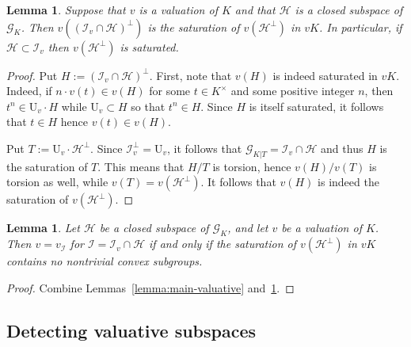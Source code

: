 \documentclass[12pt]{amsart}
\newcommand{\Urm}{\mathrm{U}}
\newcommand{\Gcal}{\mathcal{G}}
\newcommand{\Ical}{\mathcal{I}}
\newcommand{\Hcal}{\mathcal{H}}
\newtheorem{lemma}[theorem]{Lemma}
\theoremstyle{definition}
\begin{document}
\begin{lemma}\label{lemma:v_perp_saturation}
  Suppose that $v$ is a valuation of $K$ and that $\Hcal$ is a closed subspace of $\Gcal_{K}$.
  Then $v((\Ical_{v} \cap \Hcal)^{\perp})$ is the saturation of $v(\Hcal^{\perp})$ in $vK$.
  In particular, if $\Hcal \subset \Ical_{v}$ then $v(\Hcal^{\perp})$ is saturated.
\end{lemma}
\begin{proof}
  Put $H := (\Ical_{v} \cap \Hcal)^{\perp}$.
  First, note that $v(H)$ is indeed saturated in $vK$.
  Indeed, if $n \cdot v(t) \in v(H)$ for some $t \in K^{\times}$ and some positive integer $n$, then $t^{n} \in \Urm_{v} \cdot H$ while $\Urm_{v} \subset H$ so that $t^{n} \in H$.
  Since $H$ is itself saturated, it follows that $t \in H$ hence $v(t) \in v(H)$.

  Put $T := \Urm_{v} \cdot \Hcal^{\perp}$.
  Since $\Ical_{v}^{\perp} = \Urm_{v}$, it follows that $\Gcal_{K|T} = \Ical_{v} \cap \Hcal$ and thus $H$ is the saturation of $T$.
  This means that $H/T$ is torsion, hence $v(H)/v(T)$ is torsion as well, while $v(T) = v(\Hcal^{\perp})$.
  It follows that $v(H)$ is indeed the saturation of $v(\Hcal^{\perp})$.
\end{proof}

\begin{lemma}\label{lemma:valuative_iff_saturation}
  Let $\Hcal$ be a closed subspace of $\Gcal_{K}$, and let $v$ be a valuation of $K$.
  Then $v = v_{\Ical}$ for $\Ical = \Ical_{v} \cap \Hcal$ if and only if the saturation of $v(\Hcal^{\perp})$ in $vK$ contains no nontrivial convex subgroups.
\end{lemma}
\begin{proof}
  Combine Lemmas~\ref{lemma:main-valuative} and~\ref{lemma:v_perp_saturation}.
\end{proof}

\subsection{Detecting valuative subspaces}
\end{document}
